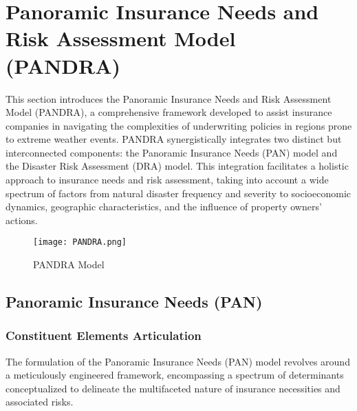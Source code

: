 \documentclass{mcmthesis}
\begin{document}
\section{Panoramic Insurance Needs and Risk Assessment Model (PANDRA)}

This section introduces the Panoramic Insurance Needs and Risk Assessment Model (PANDRA), a comprehensive framework developed to assist insurance companies in navigating the complexities of underwriting policies in regions prone to extreme weather events. PANDRA synergistically integrates two distinct but interconnected components: the Panoramic Insurance Needs (PAN) model and the Disaster Risk Assessment (DRA) model. This integration facilitates a holistic approach to insurance needs and risk assessment, taking into account a wide spectrum of factors from natural disaster frequency and severity to socioeconomic dynamics, geographic characteristics, and the influence of property owners' actions.

\begin{figure}[h]
    \centering
    \texttt{[image: PANDRA.png]}
    \caption{PANDRA Model} \label{PANDRA}
\end{figure}

\subsection{Panoramic Insurance Needs (PAN)}
\subsubsection{Constituent Elements Articulation}
The formulation of the Panoramic Insurance Needs (PAN) model revolves around a meticulously engineered framework, encompassing a spectrum of determinants conceptualized to delineate the multifaceted nature of insurance necessities and associated risks.
\end{document}
